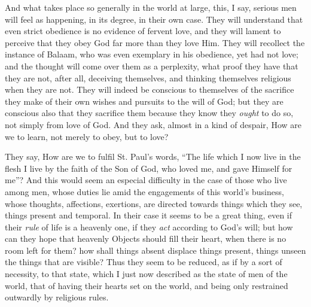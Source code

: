 And what takes place so generally in the world at large, this, I
say, serious men will feel as happening, in its degree, in their own
case. They will understand that even strict obedience is no evidence
of fervent love, and they will lament to perceive that they obey God
far more than they love Him. They will recollect the instance of
Balaam, who was even exemplary in his obedience, yet had not love; and
the thought will come over them as a perplexity, what proof they have
that they are not, after all, deceiving themselves, and thinking
themselves religious when they are not. They will indeed be conscious
to themselves of the sacrifice they make of their own wishes and
pursuits to the will of God; but they are conscious also that they
sacrifice them because they know they \emph{ought} to do so, not
simply from love of God. And they ask, almost in a kind of despair,
How are we to learn, not merely to obey, but to love?

They say, How are we to fulfil St. Paul's words, ``The life
which I now live in the flesh I live by the faith of the Son of God,
who loved me, and gave Himself for me''? And this would seem an
especial difficulty in the case of those who live among men, whose
duties lie amid the engagements of this world's business, whose
thoughts, affections, exertions, are directed towards things which
they see, things present and temporal. In their case it seems to be a
great thing, even if their \emph{rule} of life is a heavenly one, if
they \emph{act} according to God's will; but how can they hope that
heavenly Objects should fill their heart, when there is no room left
for them? how shall things absent displace things present, things
unseen the things that are visible? Thus they seem to be reduced, as
if by a sort of necessity, to that state, which I just now described
as the state of men of the world, that of having their hearts set on
the world, and being only restrained outwardly by religious rules.

